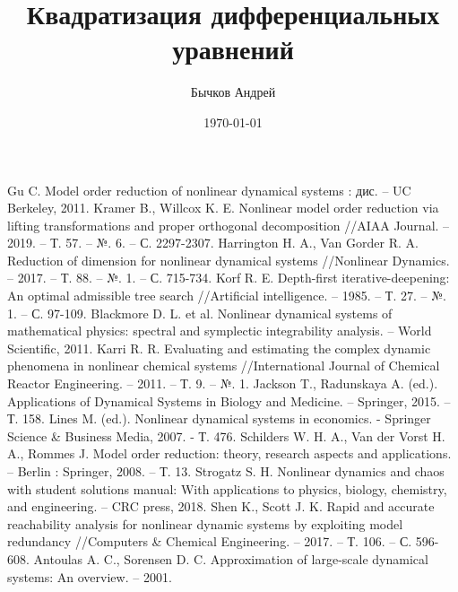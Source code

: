 \documentclass[a4paper,14pt]{article}
\author{Бычков Андрей}
\title{Квадратизация дифференциальных уравнений}
\date{\today}
\begin{document}
 


\tableofcontents










\begin{thebibliography}{9}
 Gu C. Model order reduction of nonlinear dynamical systems : дис. – UC Berkeley, 2011.
 Kramer B., Willcox K. E. Nonlinear model order reduction via lifting transformations and proper orthogonal decomposition //AIAA Journal. – 2019. – Т. 57. – №. 6. – С. 2297-2307.
 Harrington H. A., Van Gorder R. A. Reduction of dimension for nonlinear dynamical systems //Nonlinear Dynamics. – 2017. – Т. 88. – №. 1. – С. 715-734.
 Korf R. E. Depth-first iterative-deepening: An optimal admissible tree search //Artificial intelligence. – 1985. – Т. 27. – №. 1. – С. 97-109.
 Blackmore D. L. et al. Nonlinear dynamical systems of mathematical physics: spectral and symplectic integrability analysis. – World Scientific, 2011.
 Karri R. R. Evaluating and estimating the complex dynamic phenomena in nonlinear chemical systems //International Journal of Chemical Reactor Engineering. – 2011. – Т. 9. – №. 1.
 Jackson T., Radunskaya A. (ed.). Applications of Dynamical Systems in Biology and Medicine. – Springer, 2015. – Т. 158.
 Lines M. (ed.). Nonlinear dynamical systems in economics. - Springer Science \& Business Media, 2007. - Т. 476.
 Schilders W. H. A., Van der Vorst H. A., Rommes J. Model order reduction: theory, research aspects and applications. – Berlin : Springer, 2008. – Т. 13.
 Strogatz S. H. Nonlinear dynamics and chaos with student solutions manual: With applications to physics, biology, chemistry, and engineering. – CRC press, 2018.
 Shen K., Scott J. K. Rapid and accurate reachability analysis for nonlinear dynamic systems by exploiting model redundancy //Computers \& Chemical Engineering. – 2017. – Т. 106. – С. 596-608.
 Antoulas A. C., Sorensen D. C. Approximation of large-scale dynamical systems: An overview. – 2001.

\end{thebibliography}
\end{document}
